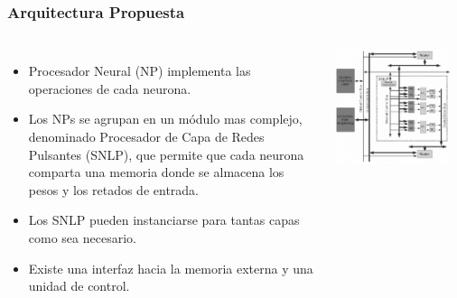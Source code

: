 \frame
{
\frametitle{Arquitectura Propuesta}
\begin{columns}
\begin{itemize}
   \item Procesador Neural (NP) implementa las operaciones de cada neurona.
   \item Los NPs se agrupan en un módulo mas complejo, denominado Procesador de Capa de Redes Pulsantes (SNLP), que permite que cada neurona comparta una memoria donde se almacena los pesos y los retados de entrada.
   \item Los SNLP pueden instanciarse para tantas capas como sea necesario. 
   \item Existe una interfaz hacia la memoria externa y una unidad de control.
    \end{itemize}     
    \includegraphics[width=0.9\textwidth]{Figs/2009_BackPropagationFF02}
\end{columns}
}


